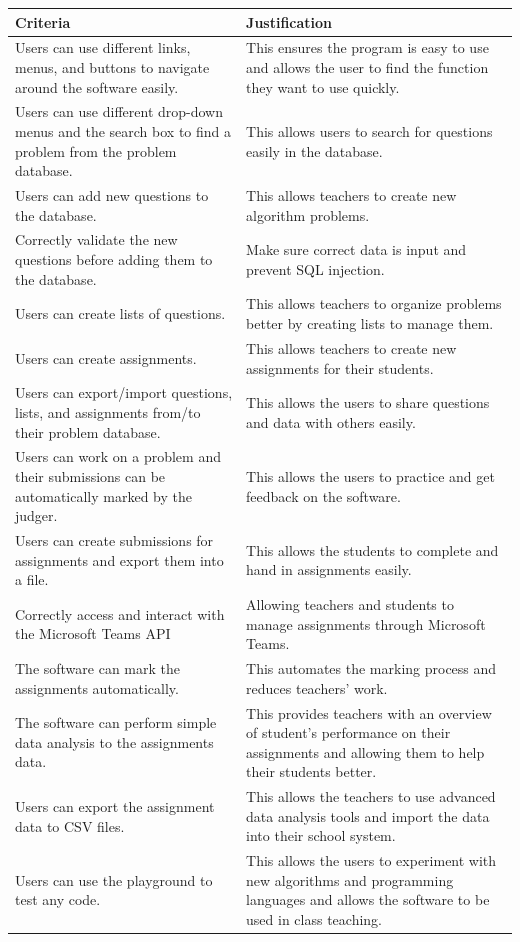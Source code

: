 \documentclass[a4paper]{report}
\begin{document}
\begin{tabulary}{\linewidth}{|L|L|}
      \hline
      Criteria & Justification\\
      \hline
      Users can use different links, menus, and buttons to navigate around the software easily. & This ensures the program is easy to use and allows the user to find the function they want to use quickly.\\
      \hline 
      Users can use different drop-down menus and the search box to find a problem from the problem database. & This allows users to search for questions easily in the database.\\
      \hline
      Users can add new questions to the database. & This allows teachers to create new algorithm problems.\\
      \hline
      Correctly validate the new questions before adding them to the database. & Make sure correct data is input and prevent SQL injection.\\
      \hline
      Users can create lists of questions. & This allows teachers to organize problems better by creating lists to manage them.\\
      \hline
      Users can create assignments. & This allows teachers to create new assignments for their students.\\
      \hline
      Users can export/import questions, lists, and assignments from/to their problem database. & This allows the users to share questions and data with others easily.\\
      \hline
      Users can work on a problem and their submissions can be automatically marked by the judger. & This allows the users to practice and get feedback on the software.\\
      \hline
      Users can create submissions for assignments and export them into a file. & This allows the students to complete and hand in assignments easily.\\
      \hline
      Correctly access and interact with the Microsoft Teams API & Allowing teachers and students to manage assignments through Microsoft Teams.\\
      \hline
      The software can mark the assignments automatically. & This automates the marking process and reduces teachers' work.\\
      \hline
      The software can perform simple data analysis to the assignments data. & This provides teachers with an overview of student's performance on their assignments and allowing them to help their students better.\\
      \hline
      Users can export the assignment data to CSV files. & This allows the teachers to use advanced data analysis tools and import the data into their school system.\\
      \hline
      Users can use the playground to test any code. & This allows the users to experiment with new algorithms and programming languages and allows the software to be used in class teaching.\\
      \hline
\end{tabulary}
\end{document}
